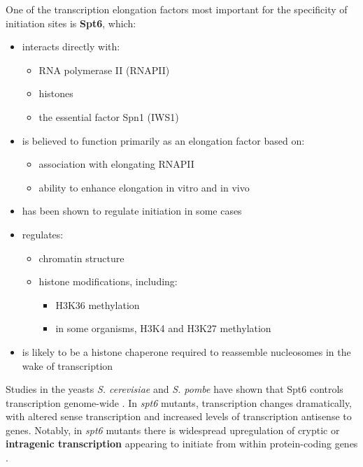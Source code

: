 \documentclass[11pt, a4paper]{article}
\begin{document}
One of the transcription elongation factors most important for the specificity of initiation sites is \textbf{Spt6}, which:
\begin{itemize}[nosep]
\item interacts directly with:
	\begin{itemize}[nosep]
	\item RNA polymerase II (RNAPII) \cite{close2011, diebold2011, liu2011, sdano2017, sun2010, yoh2007}
	\item histones \cite{bortvin1996, mccullough2015}
	\item the essential factor Spn1 (IWS1) \cite{diebold2010b, li2018, mcdonald2010}
	\end{itemize}
\item is believed to function primarily as an elongation factor based on:
	\begin{itemize}[nosep]
	\item association with elongating RNAPII \cite{andrulis2000, ivanovska2011, kaplan2000, mayer2010}
	\item ability to enhance elongation in vitro \cite{endoh2004} and in vivo \cite{ardehali2009}
	\end{itemize}
\item has been shown to regulate initiation in some cases \cite{adkins2006, ivanovska2011}
\item regulates:
	\begin{itemize}[nosep]
	\item chromatin structure \cite{bortvin1996, degennaro2013, ivanovska2011, jeronimo2015, kaplan2003, perales2013, vanbakel2013}
	\item histone modifications, including:
		\begin{itemize}[nosep]
		\item H3K36 methylation \cite{carrozza2005, chu2006, yoh2008, youdell2008}
		\item in some organisms, H3K4 and H3K27 methylation \cite{begum2012, chen2012, degennaro2013, wang2017, wang2013}
		\end{itemize}
	\end{itemize}
\item is likely to be a histone chaperone required to reassemble nucleosomes in the wake of transcription \cite{duina2011}
\end{itemize}

Studies in the yeasts \textit{S. cerevisiae} and \textit{S. pombe} have shown that Spt6 controls transcription genome-wide \cite{cheung2008, degennaro2013, kaplan2003, pathak2018, uwimana2017, vanbakel2013}. In \textit{spt6} mutants, transcription changes dramatically, with altered sense transcription and increased levels of transcription antisense to genes. Notably, in \textit{spt6} mutants there is widespread upregulation of cryptic or \textbf{intragenic transcription} appearing to initiate from within protein-coding genes \cite{cheung2008, degennaro2013, kaplan2003, uwimana2017}.
\end{document}
